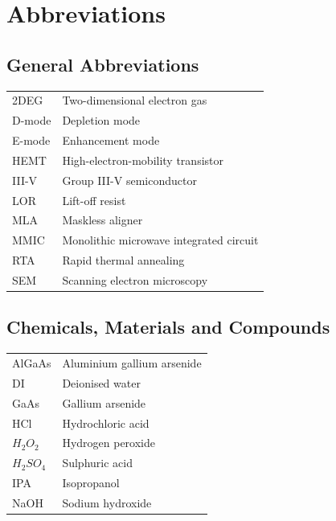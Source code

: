 \cleardoublepage
\chapter*{Abbreviations}

\section*{General Abbreviations}
\begin{tabularx}{\linewidth}{@{}lY@{}}
  2DEG & Two-dimensional electron gas \\
  D-mode & Depletion mode \\
  E-mode & Enhancement mode \\
  HEMT & High-electron-mobility transistor \\
  III-V & Group III-V semiconductor \\
  LOR & Lift-off resist \\
  MLA & Maskless aligner \\
  MMIC & Monolithic microwave integrated circuit \\
  RTA & Rapid thermal annealing \\
  SEM & Scanning electron microscopy \\
\end{tabularx}

\section*{Chemicals, Materials and Compounds}
\begin{tabularx}{\linewidth}{@{}lY@{}}
  AlGaAs & Aluminium gallium arsenide \\
  DI & Deionised water \\
  GaAs & Gallium arsenide \\
  HCl & Hydrochloric acid \\
  $H_2O_2$ & Hydrogen peroxide \\
  $H_2SO_4$ & Sulphuric acid \\
  IPA & Isopropanol \\
  NaOH & Sodium hydroxide \\
\end{tabularx}

